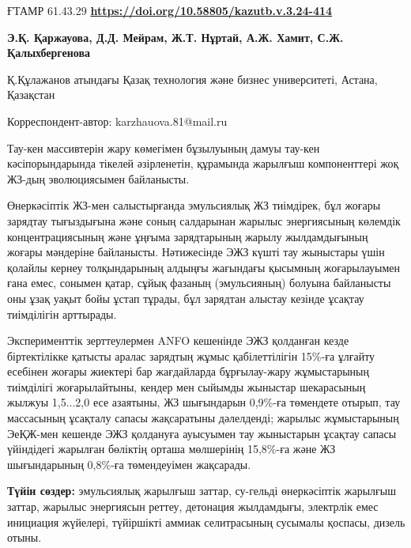 \newpage
ҒТАМР 61.43.29
\hfill {\bfseries \href{https://doi.org/10.58805/kazutb.v.3.24-414}{https://doi.org/10.58805/kazutb.v.3.24-414}}


\begin{center}
{\bfseries Э.Қ. Қаржауова\envelope, Д.Д. Мейрам, Ж.Т. Нұртай, А.Ж. Хамит, С.Ж. Қалыхбергенова}

Қ.Құлажанов атындағы Қазақ технология және бизнес университеті, Астана,
Қазақстан
\end{center}
\envelope Корреспондент-автор: karzhauova.81@mail.ru

Тау-кен массивтерін жару көмегімен бұзылуының дамуы тау-кен
кәсіпорындарында тікелей әзірленетін, құрамында жарылғыш компоненттері
жоқ ЖЗ-дың эволюциясымен байланысты.

Өнеркәсіптік ЖЗ-мен салыстырғанда эмульсиялық ЖЗ тиімдірек, бұл жоғары
зарядтау тығыздығына және соның салдарынан жарылыс энергиясының көлемдік
концентрациясының және ұңғыма зарядтарының жарылу жылдамдығының жоғары
мәндеріне байланысты. Нәтижесінде ЭЖЗ күшті тау жыныстары үшін қолайлы
кернеу толқындарының алдыңғы жағындағы қысымның жоғарылауымен ғана емес,
сонымен қатар, сұйық фазаның (эмульсияның) болуына байланысты оны ұзақ
уақыт бойы ұстап тұрады, бұл зарядтан алыстау кезінде ұсақтау
тиімділігін арттырады.

Эксперименттік зерттеулермен ANFO кешенінде ЭЖЗ қолданған кезде
біртектілікке қатысты аралас зарядтың жұмыс қабілеттілігін 15\%-ға
ұлғайту есебінен жоғары жиектері бар жағдайларда бұрғылау-жару
жұмыстарының тиімділігі жоғарылайтыны, кендер мен сыйымды жыныстар
шекарасының жылжуы 1,5...2,0 есе азаятыны, ЖЗ шығындарын 0,9\%-ға
төмендете отырып, тау массасының ұсақталу сапасы жақсаратыны дәлелденді;
жарылыс жұмыстарының ЭеҚЖ-мен кешенде ЭЖЗ қолдануға ауысуымен тау
жыныстарын ұсақтау сапасы үйіндідегі жарылған бөліктің орташа мөлшерінің
15,8\%-ға және ЖЗ шығындарының 0,8\%-ға төмендеуімен жақсарады.

{\bfseries Түйін сөздер:} эмульсиялық жарылғыш заттар, су-гельді
өнеркәсіптік жарылғыш заттар, жарылыс энергиясын реттеу, детонация
жылдамдығы, электрлік емес инициация жүйелері, түйіршікті аммиак
селитрасының сусымалы қоспасы, дизель отыны.



